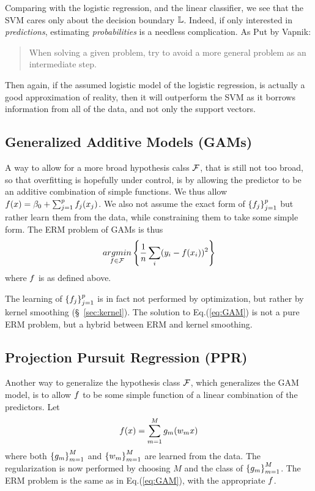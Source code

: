 \begin{remark}
Comparing with the logistic regression, and the linear classifier, we see that the SVM cares only about the decision boundary $\mathbb{L}$. Indeed, if only interested in \emph{predictions}, estimating \emph{probabilities} is a needless complication. As Put by Vapnik: 
\begin{quote}
When solving a given problem, try to avoid a more general problem as an intermediate
step.
\end{quote}
Then again, if the assumed logistic model of the logistic regression, is actually a good approximation of reality, then it will outperform the SVM as it borrows information from all of the data, and not only the support vectors. 
\end{remark}


\subsection{Generalized Additive Models (GAMs)}
\label{sec:gam}
A way to allow for a more broad hypothesis calss $\mathcal{F}$, that is still not too broad, so that overfitting is hopefully under control, is by allowing the predictor to be an additive combination of simple functions.
We thus allow $f(x)=\beta_0 + \sum_{j=1}^p f_j(x_j)$. We also not assume the exact form of $\left\{ f_j \right\}_{j=1}^p$ but rather learn them from the data, while constraining them to take some simple form.
The ERM problem of GAMs is thus
\begin{align}
\label{eq:GAM}
	 \mathop{argmin} _{f \in \mathcal{F}}\left\{ \frac{1}{n}\sum_i (y_i-f(x_i))^2   \right\}
\end{align}
where $f$ is as defined above.

\begin{remark}
The learning of $\left\{ f_j \right\}_{j=1}^p$ is in fact not performed by optimization, but rather by kernel smoothing (\S~\ref{sec:kernel}).
The solution to Eq.(\ref{eq:GAM}) is not a pure ERM problem, but a hybrid between ERM and kernel smoothing.
\end{remark}



\subsection{Projection Pursuit Regression (PPR)}
\label{sec:ppr}
Another way to generalize the hypothesis class $\mathcal{F}$, which generalizes the GAM model, is to allow $f$ to be some simple function of a linear combination of the predictors. Let 
\begin{align}
\label{eq:PPR}
	f(x)=\sum_{m=1}^M g_m(w_m x)
\end{align}
where both $\left\{ g_m \right\}_{m=1}^M$ and $\left\{ w_m \right\}_{m=1}^M$ are learned from the data. 
The regularization is now performed by choosing $M$ and the class of $\left\{ g_m \right\}_{m=1}^M$.
The ERM problem is the same as in Eq.(\ref{eq:GAM}), with the appropriate $f$.

